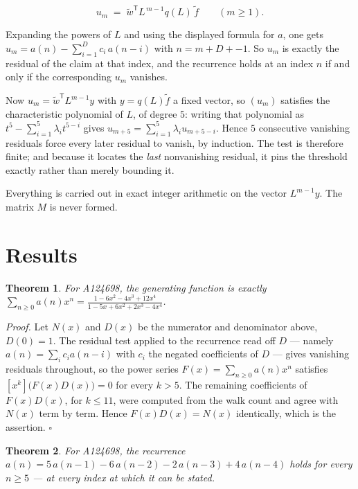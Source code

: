 \documentclass[11pt]{article}
\newtheorem{theorem}{Theorem}
\theoremstyle{definition}
\begin{document}
\[u_m \;=\; \tilde w^{\mathsf T} L^{\,m-1} q(L)\,\tilde f \qquad (m \ge 1).\]

Expanding the powers of $L$ and using the displayed formula for $a$, one gets $u_m = a(n) - \sum_{i=1}^{D} c_i\,a(n-i)$ with $n = m + D + -1$. So $u_m$ is exactly the residual of the claim at that index, and the recurrence holds at an index $n$ if and only if the corresponding $u_m$ vanishes.

Now $u_m = \tilde w^{\mathsf T} L^{m-1} y$ with $y = q(L)\tilde f$ a fixed vector, so $(u_m)$ satisfies the characteristic polynomial of $L$, of degree $5$: writing that polynomial as $t^{5} - \sum_{i=1}^{5} \lambda_i t^{5-i}$ gives $u_{m+5} = \sum_{i=1}^{5} \lambda_i u_{m+5-i}$. Hence $5$ consecutive vanishing residuals force every later residual to vanish, by induction. The test is therefore finite; and because it locates the {\itshape last} nonvanishing residual, it pins the threshold exactly rather than merely bounding it.

Everything is carried out in exact integer arithmetic on the vector $L^{m-1}y$. The matrix $M$ is never formed.

\section{Results}

\begin{theorem} For A124698, the generating function is exactly $\sum_{n\ge 0} a(n)x^n = \frac{1 - 6x^{2} - 4x^{3} + 12x^{4}}{1 - 5x + 6x^{2} + 2x^{3} - 4x^{4}}$.\end{theorem}

{\itshape Proof.} Let $N(x)$ and $D(x)$ be the numerator and denominator above, $D(0)=1$. The residual test applied to the recurrence read off $D$ --- namely $a(n) = \sum_i c_i a(n-i)$ with $c_i$ the negated coefficients of $D$ --- gives vanishing residuals throughout, so the power series $F(x)=\sum_{n\ge 0}a(n)x^n$ satisfies $[x^k]\bigl(F(x)D(x)\bigr) = 0$ for every $k > 5$. The remaining coefficients of $F(x)D(x)$, for $k \le 11$, were computed from the walk count and agree with $N(x)$ term by term. Hence $F(x)D(x) = N(x)$ identically, which is the assertion. $\square$

\begin{theorem} For A124698, the recurrence $a(n) = 5\,a(n-1) - 6\,a(n-2) - 2\,a(n-3) + 4\,a(n-4)$ holds for every $n \ge 5$ --- at every index at which it can be stated.\end{theorem}
\end{document}
